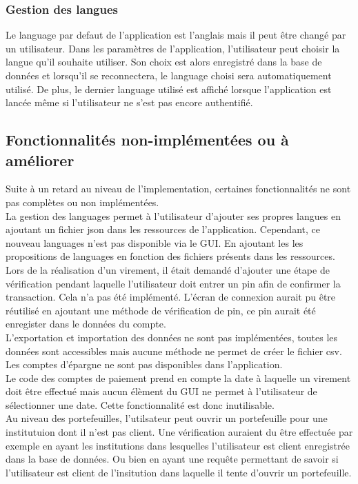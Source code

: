 \documentclass[../rapport.tex]{subfiles}
\begin{document}
\subsubsection{Gestion des langues}
Le language par defaut de l'application est l'anglais mais il peut être changé par un utilisateur. Dans les paramètres de l'application, 
l'utilisateur peut choisir la langue qu'il souhaite utiliser. Son choix est alors enregistré dans la base de données et lorsqu'il se reconnectera,
le language choisi sera automatiquement utilisé. De plus, le dernier language utilisé est affiché lorsque l'application est lancée même si l'utilisateur 
ne s'est pas encore authentifié.

\subsection{Fonctionnalités non-implémentées ou à améliorer}
Suite à un retard au niveau de l'implementation, certaines fonctionnalités ne sont pas complètes ou non implémentées.\\
La gestion des languages permet à l'utilisateur d'ajouter ses propres langues en ajoutant un fichier json dans les ressources de l'application. Cependant, ce nouveau
languages n'est pas disponible via le GUI. En ajoutant les les propositions de languages en fonction des fichiers présents dans les ressources.\\ 
Lors de la réalisation d'un virement, il était demandé d'ajouter une étape de vérification pendant laquelle l'utilisateur doit entrer un pin afin de confirmer la transaction.
Cela n'a pas été implémenté. L'écran de connexion aurait pu être réutilisé en ajoutant une méthode de vérification de pin, ce pin aurait été enregister dans le données du compte.\\
L'exportation et importation des données ne sont pas implémentées, toutes les données sont accessibles mais aucune méthode ne permet de créer le fichier csv.\\
Les comptes d'épargne ne sont pas disponibles dans l'application.\\ 
Le code des comptes de paiement prend en compte la date à laquelle un virement doit être effectué mais aucun élèment du GUI ne permet à l'utilisateur de sélectionner une date. Cette fonctionnalité est donc inutilisable. \\
Au niveau des portefeuilles, l'utilsateur peut ouvrir un portefeuille pour une institutuion dont il n'est pas client. Une vérification auraient du être effectuée par exemple en ayant les institutions dans lesquelles l'utilisateur est client enregistrée dans la base de données. Ou bien en ayant une requête permettant de savoir si l'utilisateur est client de l'insitution dans laquelle il tente d'ouvrir un portefeuille.\\
\end{document}
